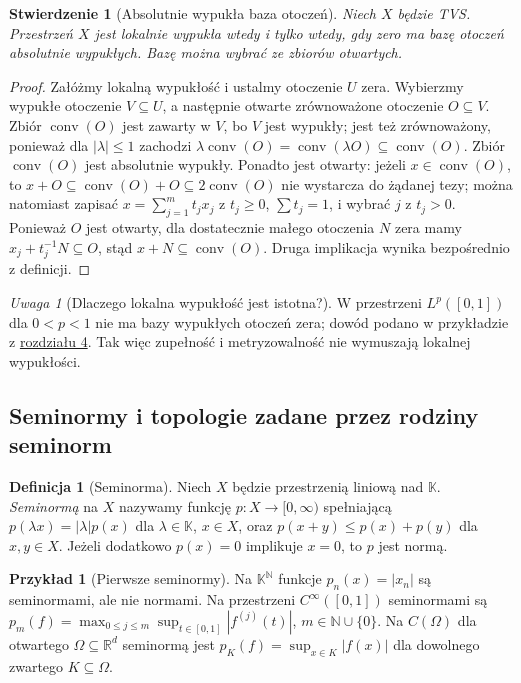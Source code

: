 \documentclass[11pt,a4paper]{article}
\numberwithin{equation}{section}
\theoremstyle{plain}
\newtheorem{stwierdzenie}[twierdzenie]{Stwierdzenie}
\theoremstyle{definition}
\newtheorem{definicja}[twierdzenie]{Definicja}
\newtheorem{przyklad}[twierdzenie]{Przykład}
\theoremstyle{remark}
\newtheorem{uwaga}[twierdzenie]{Uwaga}
\newcommand{\R}{\mathbb R}
\newcommand{\N}{\mathbb N}
\newcommand{\K}{\mathbb K}
\begin{document}
\begin{stwierdzenie}[Absolutnie wypukła baza otoczeń]
\label{prop:absconv-base}
Niech $X$ będzie TVS. Przestrzeń $X$ jest lokalnie wypukła
wtedy i tylko wtedy, gdy zero ma bazę otoczeń absolutnie wypukłych.
Bazę można wybrać ze zbiorów otwartych.
\end{stwierdzenie}
\begin{proof}
Załóżmy lokalną wypukłość i ustalmy otoczenie $U$ zera.
Wybierzmy wypukłe otoczenie $V\subseteq U$, a następnie
otwarte zrównoważone otoczenie $O\subseteq V$.
Zbiór $\operatorname{conv}(O)$ jest zawarty w $V$,
bo $V$ jest wypukły; jest też zrównoważony,
ponieważ dla $|\lambda|\le1$ zachodzi
$\lambda\operatorname{conv}(O)=\operatorname{conv}(\lambda O)
\subseteq\operatorname{conv}(O)$.
Zbiór $\operatorname{conv}(O)$ jest absolutnie wypukły.
Ponadto jest otwarty: jeżeli $x\in\operatorname{conv}(O)$,
to $x+O\subseteq\operatorname{conv}(O)+O\subseteq
2\operatorname{conv}(O)$ nie wystarcza do żądanej tezy;
można natomiast zapisać $x=\sum_{j=1}^m t_jx_j$
z $t_j\ge0$, $\sum t_j=1$, i wybrać $j$ z $t_j>0$.
Ponieważ $O$ jest otwarty, dla dostatecznie małego
otoczenia $N$ zera mamy $x_j+t_j^{-1}N\subseteq O$,
stąd $x+N\subseteq\operatorname{conv}(O)$.
Druga implikacja wynika bezpośrednio z definicji.
\end{proof}

\begin{uwaga}[Dlaczego lokalna wypukłość jest istotna?]
W przestrzeni $L^p([0,1])$ dla $0<p<1$ nie ma bazy
wypukłych otoczeń zera; dowód podano w
przykładzie z \hyperref[sec:rodziny-metryzowalnosc]{rozdziału 4}.
Tak więc zupełność i metryzowalność nie wymuszają lokalnej wypukłości.
\end{uwaga}

\subsection{Seminormy i topologie zadane przez rodziny seminorm}

\begin{definicja}[Seminorma]
Niech $X$ będzie przestrzenią liniową nad $\K$.
\emph{Seminormą} na $X$ nazywamy funkcję
$p:X\to[0,\infty)$ spełniającą
$p(\lambda x)=|\lambda|p(x)$ dla $\lambda\in\K$, $x\in X$,
oraz $p(x+y)\le p(x)+p(y)$ dla $x,y\in X$.
Jeżeli dodatkowo $p(x)=0$ implikuje $x=0$, to $p$ jest normą.
\end{definicja}

\begin{przyklad}[Pierwsze seminormy]
Na $\K^{\N}$ funkcje $p_n(x)=|x_n|$ są seminormami, ale
nie normami. Na przestrzeni $C^\infty([0,1])$ seminormami są
$p_m(f)=\max_{0\le j\le m}\sup_{t\in[0,1]}|f^{(j)}(t)|$,
$m\in\N\cup\{0\}$. Na $C(\Omega)$ dla otwartego
$\Omega\subseteq\R^d$ seminormą jest
$p_K(f)=\sup_{x\in K}|f(x)|$ dla dowolnego zwartego $K\subseteq\Omega$.
\end{przyklad}
\end{document}
